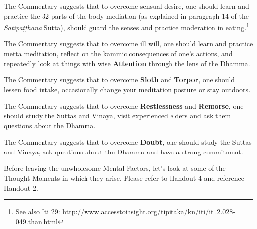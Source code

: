 The Commentary suggests that to overcome sensual desire, one should learn and practice the 32 parts of the body mediation (as explained in paragraph 14 of the \textit{Satipaṭṭhāna} Sutta), should guard the senses and practice moderation in eating.\footnote{See also Iti 29: \url{http://www.accesstoinsight.org/tipitaka/kn/iti/iti.2.028-049.than.html}}

The Commentary suggests that to overcome ill will, one should learn and practice mettā meditation, reflect on the kammic consequences of one’s actions, and repeatedly look at things with wise \textbf{Attention} through the lens of the Dhamma.

The Commentary suggests that to overcome \textbf{Sloth} and \textbf{Torpor}, one should lessen food intake, occasionally change your meditation posture or stay outdoors.

The Commentary suggests that to overcome \textbf{Restlessness} and \textbf{Remorse}, one should study the Suttas and Vinaya, visit experienced elders and ask them questions about the Dhamma.

The Commentary suggests that to overcome \textbf{Doubt}, one should study the Suttas and Vinaya, ask questions about the Dhamma and have a strong commitment.

Before leaving the unwholesome Mental Factors, let’s look at some of the Thought Moments in which they arise. Please refer to Handout 4 and reference Handout 2.

